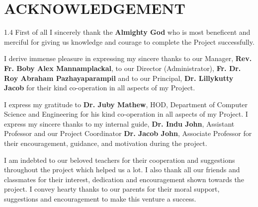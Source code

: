 \chapter*{ACKNOWLEDGEMENT}
\begin{spacing}{1.4}
\setlength{\parindent}{0pt}
\setlength{\parskip}{1.1em}
First of all I sincerely thank the \textbf{Almighty God} who is most beneficent and merciful for giving us knowledge and courage to complete the Project successfully.

I derive immense pleasure in expressing my sincere thanks to our Manager, \textbf{Rev. Fr. Boby Alex Mannamplackal}, to our Director (Administrator), \textbf{Fr. Dr. Roy Abraham Pazhayaparampil} and to our Principal, \textbf{Dr. Lillykutty Jacob} for their kind co-operation in all aspects of my Project.

I express my gratitude to \textbf{Dr. Juby Mathew}, HOD, Department of Computer Science and Engineering for his kind co-operation in all aspects of my Project. I express my sincere thanks to my internal guide, \textbf{Dr. Indu John}, Assistant Professor and our Project Coordinator \textbf{Dr. Jacob John}, Associate Professor for their encouragement, guidance, and motivation during the project.

I am indebted to our beloved teachers for their cooperation and suggestions throughout the project which helped us a lot. I also thank all our friends and classmates for their interest, dedication and encouragement shown towards the project. I convey hearty thanks to our parents for their moral support, suggestions and encouragement to make this venture a success.
\end{spacing}
